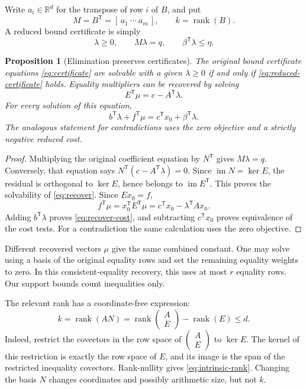 \documentclass[11pt,letterpaper]{article}
\newcommand{\R}{\mathbb R}
\newcommand{\T}{\mathsf T}
\DeclareMathOperator{\rank}{rank}
\DeclareMathOperator{\im}{im}
\newtheorem{proposition}[theorem]{Proposition}
\theoremstyle{definition}
\theoremstyle{remark}
\numberwithin{equation}{section}
\begin{document}
Write \(a_i\in\R^d\) for the transpose of row \(i\) of \(B\), and put
\[
 M=B^\T=[\,a_1\ \cdots\ a_m\,],\qquad k=\rank(B).
\]
A reduced bound certificate is simply
\begin{equation}\label{eq:reduced-certificate}
 \lambda\ge0,\qquad M\lambda=q,\qquad \beta^\T\lambda\le\eta.
\end{equation}

\begin{proposition}[Elimination preserves certificates]\label{prop:recovery}
The original bound certificate equations \eqref{eq:certificate} are solvable
with a given \(\lambda\ge0\) if and only if
\eqref{eq:reduced-certificate} holds. Equality multipliers can be recovered
by solving
\begin{equation}\label{eq:recover}
 E^\T\mu=c-A^\T\lambda .
\end{equation}
For every solution of this equation,
\begin{equation}\label{eq:recover-cost}
 b^\T\lambda+f^\T\mu=c^\T x_0+\beta^\T\lambda .
\end{equation}
The analogous statement for contradictions uses the zero objective and a
strictly negative reduced cost.
\end{proposition}
\begin{proof}
Multiplying the original coefficient equation by \(N^\T\) gives
\(M\lambda=q\). Conversely, that equation says
\(N^\T(c-A^\T\lambda)=0\). Since \(\im N=\ker E\), the residual is
orthogonal to \(\ker E\), hence belongs to \(\im E^\T\).
This proves the solvability of \eqref{eq:recover}. Since \(Ex_0=f\),
\[
 f^\T\mu=x_0^\T E^\T\mu
     =c^\T x_0-\lambda^\T Ax_0.
\]
Adding \(b^\T\lambda\) proves \eqref{eq:recover-cost}, and subtracting
\(c^\T x_0\) proves equivalence of the cost tests. For a contradiction the
same calculation uses the zero objective.
\end{proof}

Different recovered vectors \(\mu\) give the same combined constant.
One may solve using a basis of the original equality rows and set the
remaining equality weights to zero. In this consistent-equality recovery,
this uses at most \(r\) equality rows.
Our support bounds count inequalities only.

The relevant rank has a coordinate-free expression:
\begin{equation}\label{eq:intrinsic-rank}
 k=\rank(AN)=\rank\begin{pmatrix}A\\E\end{pmatrix}-\rank(E)\le d.
\end{equation}
Indeed, restrict the covectors in the row space of \(\begin{pmatrix}A\\E\end{pmatrix}\)
to \(\ker E\). The kernel of this restriction is exactly the row space of
\(E\), and its image is the span of the restricted inequality covectors.
Rank-nullity gives \eqref{eq:intrinsic-rank}. Changing the basis \(N\) changes
coordinates and possibly arithmetic size, but not \(k\).
\end{document}
